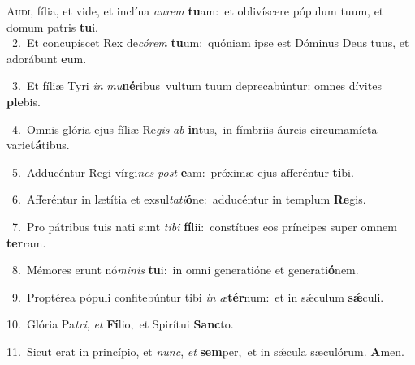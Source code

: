 \lettrine{\initial\textcolor{\initialcolor}{A}}{udi,} fília, et vide, et inclína \textit{au}\-\textit{rem} \textbf{tu}\-am:~\star et oblivíscere pópulum tuum, et domum patris \textbf{tu}\-i.\\
{\numbfont\textcolor{\numbcolor}{~2.}}~Et concupíscet Rex de\-\textit{có}\-\textit{rem} \textbf{tu}\-um:~\star quóniam ipse est Dóminus Deus tuus, et adorábunt \textbf{e}\-um.\par
{\numbfont\textcolor{\numbcolor}{~3.}}~Et fíliæ Tyri \textit{in} \textit{mu}\-\textbf{né}ribus~\star vultum tuum deprecabúntur: omnes dívites \textbf{ple}\-bis.\par
{\numbfont\textcolor{\numbcolor}{~4.}}~Omnis glória ejus fíliæ Re\textit{gis} \textit{ab} \textbf{in}\-tus,~\star in fímbriis áureis circumamícta varie\-\textbf{tá}\-tibus.\par
{\numbfont\textcolor{\numbcolor}{~5.}}~Adducéntur Regi vírgi\textit{nes} \textit{post} \textbf{e}\-am:~\star próximæ ejus afferéntur \textbf{ti}\-bi.\par
{\numbfont\textcolor{\numbcolor}{~6.}}~Afferéntur in lætítia et exsul\-\textit{ta}\-\textit{ti}\textbf{ó}ne:~\star adducéntur in templum \textbf{Re}\-gis.\par
{\numbfont\textcolor{\numbcolor}{~7.}}~Pro pátribus tuis nati sunt \textit{ti}\-\textit{bi} \textbf{fí}\-lii:~\star constítues eos príncipes super omnem \textbf{ter}\-ram.\par
{\numbfont\textcolor{\numbcolor}{~8.}}~Mémores erunt nó\-\textit{mi}\-\textit{nis} \textbf{tu}\-i:~\star in omni generatióne et generati\-\textbf{ó}\-nem.\par
{\numbfont\textcolor{\numbcolor}{~9.}}~Proptérea pópuli confitebúntur tibi \textit{in} \textit{æ}\-\textbf{tér}num:~\star et in sǽculum \textbf{sǽ}\-culi.\par
{\numbfont\textcolor{\numbcolor}{10.}}~Glória Pa\-\textit{tri}\-, \textit{et} \textbf{Fí}\-lio,~\star et Spirítui \textbf{Sanc}\-to.\par
{\numbfont\textcolor{\numbcolor}{11.}}~Sicut erat in princípio, et \textit{nunc}\-, \textit{et} \textbf{sem}\-per,~\star et in sǽcula sæculórum. \textbf{A}\-men.\par
